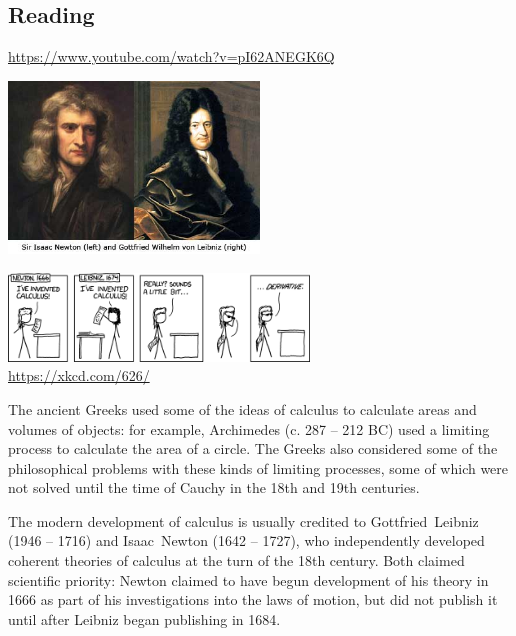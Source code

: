 



\subsection*{Reading}
\begin{center}
\begin{tcolorbox}[width=0.8\textwidth,colback={white},title={\textbf{Go and watch...}},colbacktitle=black,coltitle=white]
  \textcolor{black}{\url{https://www.youtube.com/watch?v=pI62ANEGK6Q}}
\end{tcolorbox}
\end{center}

\begin{center}
  \includegraphics[width=0.5\textwidth]{newton-leibniz}

  \includegraphics[width=0.6\textwidth]{newton-leibniz-2}\\
  \small{\url{https://xkcd.com/626/}}
\end{center}

The ancient Greeks used some of the ideas of calculus to calculate areas and volumes of
objects: for example, Archimedes (c. 287 -- 212 BC) used a limiting process to calculate the area of
a circle. The Greeks also considered some of the philosophical problems with these kinds of limiting
processes, some of which were not solved until the time of Cauchy in the 18th and 19th centuries.

The modern development of calculus is usually credited to Gottfried~Leibniz (1946 -- 1716)
and Isaac~Newton (1642 -- 1727), who independently developed coherent theories of calculus at the
turn of the 18th century. Both claimed scientific priority: Newton claimed to have begun development
of his theory in 1666 as part of his investigations into the laws of motion, but did not publish it
until after Leibniz began publishing in 1684.

